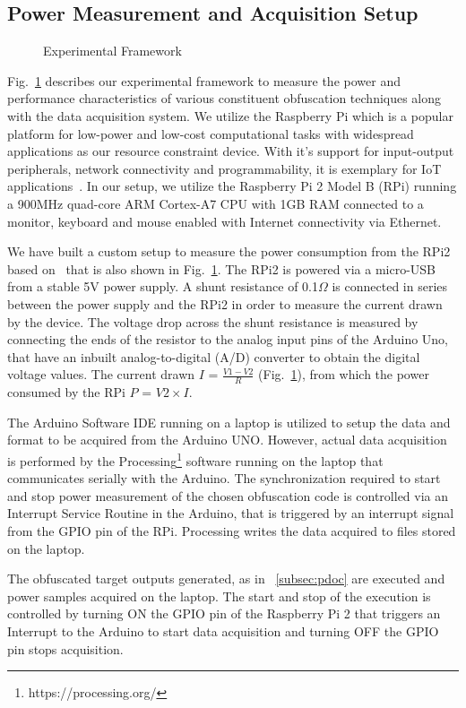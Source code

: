 \subsection{Power Measurement and Acquisition Setup}
\begin{figure}[t]
  \centering
  \caption{Experimental Framework}\label{expsetup}
\end{figure}
Fig.~\ref{expsetup} describes our experimental framework to measure the power and performance characteristics of various constituent obfuscation techniques along with the data acquisition system. We utilize the Raspberry Pi which is a popular platform for low-power and low-cost computational tasks with widespread applications as our resource constraint device. With it's support for input-output peripherals, network connectivity and programmability, it is exemplary for IoT applications~\cite{maksimovic2014raspberry}. In our setup, we utilize the Raspberry Pi 2 Model B (RPi) running a 900MHz quad-core ARM Cortex-A7 CPU with 1GB RAM connected to a monitor, keyboard and mouse enabled with Internet connectivity via Ethernet. 

We have built a custom setup to measure the power consumption from the RPi2 based on~\cite{6976079, kaup2014powerpi} that is also shown in Fig.~\ref{expsetup}. The RPi2 is powered via a micro-USB from a stable 5V power supply. A shunt resistance of 0.1$\Omega$ is connected in series between the power supply and the RPi2 in order to measure the current drawn by the device. The voltage drop across the shunt resistance is measured by connecting the ends of the resistor to the analog input pins of the Arduino Uno, that have an inbuilt analog-to-digital (A/D) converter to obtain the digital voltage values. The current drawn $I$ = $\frac{V1 - V2}{R}$ (Fig.~\ref{expsetup}), from which the power consumed by the RPi $P$ = $V2 \times I$.

The Arduino Software IDE running on a laptop is utilized to setup the data and format to be acquired from the Arduino UNO. However, actual data acquisition is performed by the Processing\footnote{https://processing.org/} software running on the laptop that communicates serially with the Arduino. The synchronization required to start and stop power measurement of the chosen obfuscation code is controlled via an Interrupt Service Routine in the Arduino, that is triggered by an interrupt signal from the GPIO pin of the RPi. Processing writes the data acquired to files stored on the laptop.

The obfuscated target outputs generated, as in ~\ref{subsec:pdoc} are executed and power samples acquired on the laptop. The start and stop of the execution is controlled by turning ON the GPIO pin of the Raspberry Pi 2 that triggers an Interrupt to the Arduino to start data acquisition and turning OFF the GPIO pin stops acquisition.   
